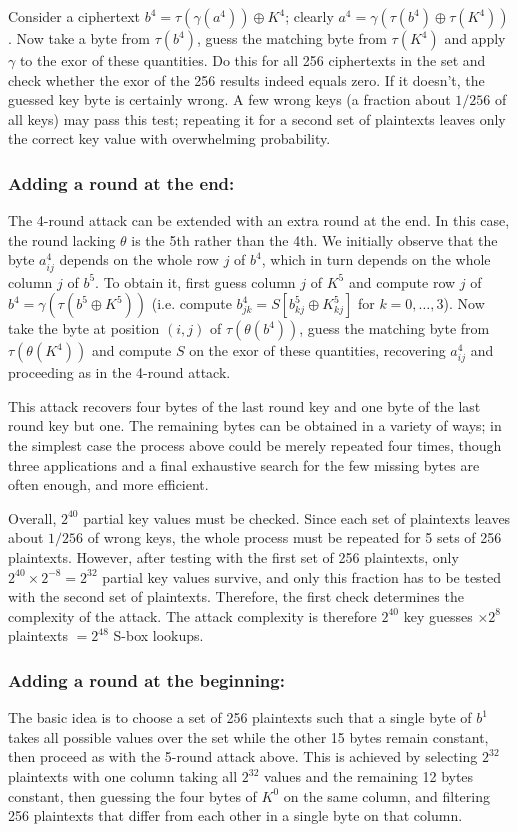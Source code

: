 \documentclass{llncs}
\begin{document}
Consider a ciphertext $b^4 = \tau(\gamma(a^4)) \oplus K^4$;
clearly $a^4 = \gamma(\tau(b^4) \oplus \tau(K^4))$. Now take a
byte from $\tau(b^4)$, guess the matching byte from $\tau(K^4)$
and apply $\gamma$ to the exor of these quantities. Do this for
all 256 ciphertexts in the set and check whether the exor of the
256 results indeed equals zero. If it doesn't, the guessed key
byte is certainly wrong. A few wrong keys (a fraction about
$1/256$ of all keys) may pass this test; repeating it for a second
set of plaintexts leaves only the correct key value with
overwhelming probability.

\subsubsection{Adding a round at the end:}
The 4-round attack can be extended with an extra round at the
end. In this case, the round lacking $\theta$ is the 5th rather
than the 4th. We initially observe that the byte $a^4_{ij}$
depends on the whole row $j$ of $b^4$, which in turn depends on
the whole column $j$ of $b^5$. To obtain it, first guess column
$j$ of $K^5$ and compute row $j$ of $b^4 = \gamma(\tau(b^5 \oplus
K^5))$ (i.e. compute $b^4_{jk} = S[b^5_{kj} \oplus K^5_{kj}]$ for
$k = 0, \dots, 3$). Now take the byte at position $(i, j)$ of
$\tau(\theta(b^4))$, guess the matching byte from
$\tau(\theta(K^4))$ and compute $S$ on the exor of these
quantities, recovering $a^4_{ij}$ and proceeding as in the
4-round attack.

This attack recovers four bytes of the last round key and one byte
of the last round key but one. The remaining bytes can
be obtained in a variety of ways; in the simplest case the process above could
be merely repeated four times, though three applications and a final exhaustive
search for the few missing bytes are often enough, and more efficient.

Overall, $2^{40}$ partial key values must be checked. Since
each set of plaintexts leaves about $1/256$ of wrong keys, the
whole process must be repeated for 5 sets of 256 plaintexts.
However, after testing with the first set of 256 plaintexts,
only $2^{40} \times 2^{-8} = 2^{32}$ partial key values survive,
and only this fraction has to be tested with the second set of
plaintexts. Therefore,
the first check determines the complexity of the attack.
The
attack complexity is therefore $2^{40}$ key guesses
$\times 2^8$ plaintexts
$= 2^{48}$ S-box lookups.

\subsubsection{Adding a round at the beginning:}
The basic idea is to choose a set of 256 plaintexts such that a
single byte of $b^1$ takes all possible values over the set while
the other 15 bytes remain constant, then proceed as with the
5-round attack above. This is achieved by selecting $2^{32}$
plaintexts with one column taking all $2^{32}$ values and the
remaining 12 bytes constant, then guessing the four bytes of
$K^0$ on the same column, and filtering 256 plaintexts that differ
from each other in a single byte on that column.
\end{document}
